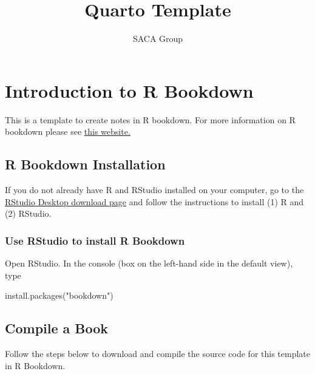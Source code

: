 \documentclass[
  letterpaper,
  oneside]{book}
\title{Quarto Template}
\author{SACA Group}
\date{}
\newenvironment{Shaded}{\begin{snugshade}}{\end{snugshade}}
\newcommand{\FunctionTok}[1]{\textcolor[rgb]{0.28,0.35,0.67}{#1}}
\newcommand{\NormalTok}[1]{\textcolor[rgb]{0.00,0.23,0.31}{#1}}
\newcommand{\StringTok}[1]{\textcolor[rgb]{0.13,0.47,0.30}{#1}}
\numberwithin{equation}{section}
\numberwithin{figure}{section}
\theoremstyle{break}
\renewcommand*\contentsname{Table of contents}
\newcommand\contentsname{Table of contents}
\theoremstyle{plain}
\theoremstyle{remark}
\begin{document}
\frontmatter
\maketitle

\renewcommand*\contentsname{Table of contents}
{
\setcounter{tocdepth}{2}
\tableofcontents
}

\mainmatter
{}

\chapter{Introduction to R Bookdown}\label{introduction-to-r-bookdown}

This is a template to create notes in R bookdown. For more information
on R bookdown please see
\href{https://bookdown.org/yihui/bookdown/?target=_blank}{this website.}

\section{R Bookdown Installation}\label{r-bookdown-installation}

If you do not already have R and RStudio installed on your computer, go
to the
\href{https://posit.co/download/rstudio-desktop/?target=_blank}{RStudio
Desktop download page} and follow the instructions to install (1) R and
(2) RStudio.

\subsection*{Use RStudio to install R
Bookdown}\label{use-rstudio-to-install-r-bookdown}

Open RStudio. In the console (box on the left-hand side in the default
view), type

\begin{Shaded}
\begin{Highlighting}[]
\FunctionTok{install.packages}\NormalTok{(}\StringTok{"bookdown"}\NormalTok{)}
\end{Highlighting}
\end{Shaded}

\section{Compile a Book}\label{compile-a-book}

Follow the steps below to download and compile the source code for this
template in R Bookdown.
\end{document}
